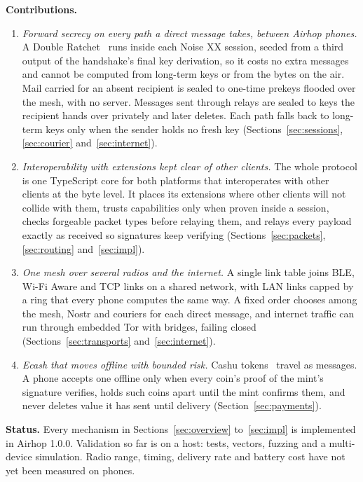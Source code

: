 \documentclass[conference]{IEEEtran}
\begin{document}
\textbf{Contributions.}
\begin{enumerate}
\item \emph{Forward secrecy on every path a direct message takes, between Airhop phones.} A Double Ratchet~\cite{doubleratchet} runs inside each Noise XX session, seeded from a third output of the handshake's final key derivation, so it costs no extra messages and cannot be computed from long-term keys or from the bytes on the air. Mail carried for an absent recipient is sealed to one-time prekeys flooded over the mesh, with no server. Messages sent through relays are sealed to keys the recipient hands over privately and later deletes. Each path falls back to long-term keys only when the sender holds no fresh key (Sections~\ref{sec:sessions}, \ref{sec:courier} and~\ref{sec:internet}).
\item \emph{Interoperability with extensions kept clear of other clients.} The whole protocol is one TypeScript core for both platforms that interoperates with other clients at the byte level. It places its extensions where other clients will not collide with them, trusts capabilities only when proven inside a session, checks forgeable packet types before relaying them, and relays every payload exactly as received so signatures keep verifying (Sections~\ref{sec:packets}, \ref{sec:routing} and~\ref{sec:impl}).
\item \emph{One mesh over several radios and the internet.} A single link table joins BLE, Wi-Fi Aware and TCP links on a shared network, with LAN links capped by a ring that every phone computes the same way. A fixed order chooses among the mesh, Nostr and couriers for each direct message, and internet traffic can run through embedded Tor with bridges, failing closed (Sections~\ref{sec:transports} and~\ref{sec:internet}).
\item \emph{Ecash that moves offline with bounded risk.} Cashu tokens~\cite{nut00} travel as messages. A phone accepts one offline only when every coin's proof of the mint's signature verifies, holds such coins apart until the mint confirms them, and never deletes value it has sent until delivery (Section~\ref{sec:payments}).
\end{enumerate}

\textbf{Status.} Every mechanism in Sections~\ref{sec:overview} to~\ref{sec:impl} is implemented in Airhop 1.0.0. Validation so far is on a host: tests, vectors, fuzzing and a multi-device simulation. Radio range, timing, delivery rate and battery cost have not yet been measured on phones.
\end{document}
